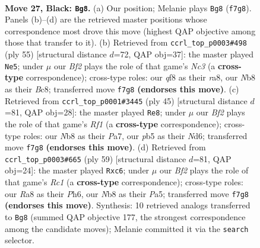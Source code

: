 \documentclass[11pt]{article}
\begin{document}
\clearpage

\begin{figure}[p]\centering
\begin{subfigure}{0.46\textwidth}\centering
\resizebox{\linewidth}{!}{%
\newchessgame
\chessboard[
  setfen={rn3Q2/pp1k1b2/1p2p1p1/1P1pP3/1P1P4/2N4B/8/4K1N1 b - - 8 27},
  showmover=false,
  pgfstyle=straightmove, color=movearrow, markmove={f7-g8}
]}
\caption{}
\end{subfigure}\hfill
\begin{subfigure}{0.46\textwidth}\centering
\resizebox{\linewidth}{!}{%
\newchessgame
\chessboard[
  setfen={R1b2r2/1p1kp3/2np2pp/1N1P2p1/8/2B2PP1/4P2P/6K1 b - - 0 28},
  showmover=false,
  pgfstyle=straightmove, color=movearrow, markmove={c6-e5}
]}
\caption{}
\end{subfigure}
\\[4pt]
\begin{subfigure}{0.46\textwidth}\centering
\resizebox{\linewidth}{!}{%
\newchessgame
\chessboard[
  setfen={5rk1/pp5p/3nNbp1/4p3/4p1P1/4P2P/PP2KP1B/2R5 b - - 0 23},
  showmover=false,
  pgfstyle=straightmove, color=movearrow, markmove={f8-e8}
]}
\caption{}
\end{subfigure}\hfill
\begin{subfigure}{0.46\textwidth}\centering
\resizebox{\linewidth}{!}{%
\newchessgame
\chessboard[
  setfen={2r3k1/5p2/2Qb2pp/p7/1p2Rp2/1P3N1P/1PP2PP1/6K1 b - - 0 30},
  showmover=false,
  pgfstyle=straightmove, color=movearrow, markmove={c8-c6}
]}
\caption{}
\end{subfigure}
\caption{\textbf{Move 27, Black: \texttt{Bg8}.} (a) Our position; Melanie plays \texttt{Bg8} (\texttt{f7g8}). Panels (b)--(d) are the retrieved master positions whose correspondence most drove this move (highest QAP objective among those that transfer to it). (b) Retrieved from \texttt{ccrl\_top\_p0003\#498} (ply 55) [structural distance $d$=72, QAP obj=37]: the master played \texttt{Ne5}; under $\mu$ our \emph{Bf2} plays the role of that game's \emph{Nc3} (a \textbf{cross-type} correspondence); cross-type roles: our \emph{q}f8 as their \emph{r}a8, our \emph{N}b8 as their \emph{B}c8; transferred move \texttt{f7g8} \textbf{(endorses this move)}. (c) Retrieved from \texttt{ccrl\_top\_p0001\#3445} (ply 45) [structural distance $d$=81, QAP obj=28]: the master played \texttt{Re8}; under $\mu$ our \emph{Bf2} plays the role of that game's \emph{Rf1} (a \textbf{cross-type} correspondence); cross-type roles: our \emph{N}b8 as their \emph{P}a7, our \emph{p}b5 as their \emph{N}d6; transferred move \texttt{f7g8} \textbf{(endorses this move)}. (d) Retrieved from \texttt{ccrl\_top\_p0003\#665} (ply 59) [structural distance $d$=81, QAP obj=24]: the master played \texttt{Rxc6}; under $\mu$ our \emph{Bf2} plays the role of that game's \emph{Rc1} (a \textbf{cross-type} correspondence); cross-type roles: our \emph{R}a8 as their \emph{P}h6, our \emph{N}b8 as their \emph{P}a5; transferred move \texttt{f7g8} \textbf{(endorses this move)}. Synthesis: 10 retrieved analogs transferred to \texttt{Bg8} (summed QAP objective 177, the strongest correspondence among the candidate moves); Melanie committed it via the \texttt{search} selector.}
\label{fig:thought-m53}
\end{figure}
\end{document}
